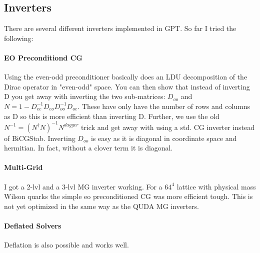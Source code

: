 \documentclass[a4paper,10pt]{scrartcl}
\begin{document}
\subsection{Inverters}
There are several different inverters implemented in GPT. So far I tried the following:
\paragraph{EO Preconditiond CG}
Using the even-odd preconditioner basically does an LDU decomposition of the Dirac operator in "even-odd" space. You can then show
that instead of inverting D you get away with inverting the two sub-matrices: $D_{oo}$ and $N = 1 - D_{ee}^{-1} D_{eo} D_{oo}^{-1} D_{oe}$.
These have only have the number of rows and columns as D so this is more efficient than inverting D. Further, we use the old 
$N^{-1} = (N^\dagger N)^{-1} N^{dagger}$ trick and get away with using a std. CG inverter instead of BiCGStab. Inverting $D_{oo}$ is easy
as it is diagonal in coordinate space and hermitian. In fact, without a clover term it is diagonal.
\paragraph{Multi-Grid}
I got a 2-lvl and a 3-lvl MG inverter working. For a $64^4$ lattice with physical mass Wilson quarks the simple eo preconditioned CG was more
efficient tough. This is not yet optimized in the same way as the QUDA MG inverters.
\paragraph{Deflated Solvers}
Deflation is also possible and works well.
\end{document}

